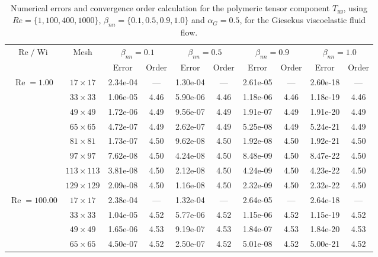 \documentclass[preprint, 12pt]{elsarticle}
\begin{document}
{\begin{center}
\begin{table}[H]
\caption{Numerical errors and convergence order calculation for the polymeric tensor component $T_{yy}$, using $Re=\{1,100,400,1000\}$, $\beta_{nn}=\{0.1,0.5,0.9,1.0\}$ and \mbox{$\alpha_G = 0.5$}, for the Giesekus viscoelastic fluid flow.\label{tab_GiesekusTyyalphaG05Wi5_10}}
\tiny{
    \begin{tabular*}{\textwidth}{@{\extracolsep\fill}cccccccccc@{}}
    \hline
    \multirow{2}{*}{$\operatorname{Re}/\operatorname{Wi}$} & \multirow{2}{*}{Mesh} & \multicolumn{2}{c}{$\beta_{nn}=0.1$}  & \multicolumn{2}{c}{$\beta_{nn}=0.5$}  & \multicolumn{2}{c}{$\beta_{nn}=0.9$}  & \multicolumn{2}{c}{$\beta_{nn}=1.0$}\\ %
     & & Error & Order & Error & Order & Error & Order & Error & Order \\
    \hline
    \multirow{7}{*}{$\operatorname{Re}=1.00$} & $17\times 17$ & 2.34e-04 & --- & 1.30e-04 & --- & 2.61e-05 & --- & 2.60e-18 & --- \\
    & $33\times 33$ & 1.06e-05 & 4.46 & 5.90e-06 & 4.46 & 1.18e-06 & 4.46 & 1.18e-19 & 4.46 \\
    & $49\times 49$ & 1.72e-06 & 4.49 & 9.56e-07 & 4.49 & 1.91e-07 & 4.49 & 1.91e-20 & 4.49 \\
    \multirow{3}{*}{$\operatorname{Wi}=5$} & $65\times 65$ & 4.72e-07 & 4.49 & 2.62e-07 & 4.49 & 5.25e-08 & 4.49 & 5.24e-21 & 4.49 \\
    & $81\times 81$ & 1.73e-07 & 4.50 & 9.62e-08 & 4.50 & 1.92e-08 & 4.50 & 1.92e-21 & 4.50 \\
    & $97\times 97$ & 7.62e-08 & 4.50 & 4.24e-08 & 4.50 & 8.48e-09 & 4.50 & 8.47e-22 & 4.50 \\
    & $113\times 113$ & 3.81e-08 & 4.50 & 2.12e-08 & 4.50 & 4.24e-09 & 4.50 & 4.23e-22 & 4.50 \\
    & $129\times 129$ & 2.09e-08 & 4.50 & 1.16e-08 & 4.50 & 2.32e-09 & 4.50 & 2.32e-22 & 4.50 \\
    \hline
    \multirow{7}{*}{$\operatorname{Re}=100.00$} & $17\times 17$ & 2.38e-04 & --- & 1.32e-04 & --- & 2.64e-05 & --- & 2.64e-18 & --- \\
    & $33\times 33$ & 1.04e-05 & 4.52 & 5.77e-06 & 4.52 & 1.15e-06 & 4.52 & 1.15e-19 & 4.52 \\
    & $49\times 49$ & 1.65e-06 & 4.53 & 9.19e-07 & 4.53 & 1.84e-07 & 4.53 & 1.84e-20 & 4.53 \\
    \multirow{3}{*}{$\operatorname{Wi}=5$} & $65\times 65$ & 4.50e-07 & 4.52 & 2.50e-07 & 4.52 & 5.01e-08 & 4.52 & 5.00e-21 & 4.52 \\

\end{tabular*}}
\end{table}
\end{center}}
\end{document}
